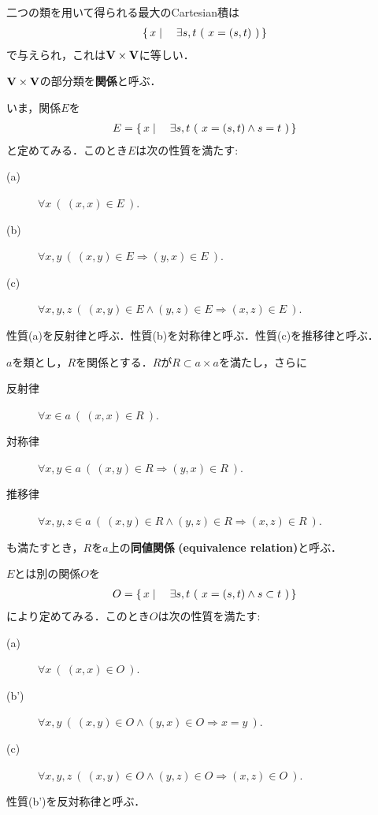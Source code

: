 	二つの類を用いて得られる最大のCartesian積は
	\begin{align}
		\left\{\, x \mid \quad \exists s,t\ (\ x=(s,t)\ )\, \right\}
	\end{align}
	で与えられ，これは$\mathbf{V} \times \mathbf{V}$に等しい．
	
	\begin{screen}
		\begin{dfn}[関係]
			$\mathbf{V} \times \mathbf{V}$の部分類を{\bf 関係}と呼ぶ．
		\end{dfn}
	\end{screen}
	
	いま，関係$E$を
	\begin{align}
		E = \left\{\, x \mid \quad \exists s,t\ (\ x=(s,t) \wedge s = t\ )\, \right\}
	\end{align}
	と定めてみる．このとき$E$は次の性質を満たす:
	\begin{description}
		\item[(a)] $\forall x\ (\ (x,x) \in E\ )$.
		\item[(b)] $\forall x,y\ (\ (x,y) \in E \Longrightarrow (y,x) \in E\ )$.
		\item[(c)] $\forall x,y,z\ (\ (x,y) \in E \wedge (y,z) \in E \Longrightarrow (x,z) \in E\ )$.
	\end{description}
	性質(a)を反射律と呼ぶ．性質(b)を対称律と呼ぶ．性質(c)を推移律と呼ぶ．
	
	\begin{screen}
		\begin{dfn}[同値関係]
			$a$を類とし，$R$を関係とする．$R$が$R \subset a \times a$を満たし，さらに
			\begin{description}
				\item[反射律] $\forall x \in a\ (\ (x,x) \in R\ )$.
				\item[対称律] $\forall x,y \in a\ (\ (x,y) \in R \Longrightarrow (y,x) \in R\ )$.
				\item[推移律] $\forall x,y,z \in a\ (\ (x,y) \in R \wedge (y,z) \in R \Longrightarrow (x,z) \in R\ )$.
			\end{description}
			も満たすとき，$R$を$a$上の{\bf 同値関係}\index{どうちかんけい@同値関係}
			{\bf (equivalence relation)}と呼ぶ．
		\end{dfn}
	\end{screen}
	
	
	$E$とは別の関係$O$を
	\begin{align}
		O = \left\{\, x \mid \quad \exists s,t\ (\ x=(s,t) \wedge s \subset t\ )\, \right\}
	\end{align}
	により定めてみる．このとき$O$は次の性質を満たす:
	\begin{description}
		\item[(a)] $\forall x\ (\ (x,x) \in O\ )$.
		\item[(b')] $\forall x,y\ (\ (x,y) \in O \wedge (y,x) \in O \Longrightarrow x=y\ )$.
		\item[(c)] $\forall x,y,z\ (\ (x,y) \in O \wedge (y,z) \in O \Longrightarrow (x,z) \in O\ )$.
	\end{description}
	性質(b')を反対称律と呼ぶ．
	
